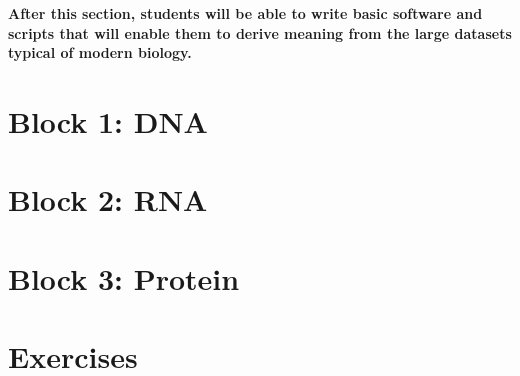 \documentclass[]{book}
\begin{document}
\textbf{After this section, students will be able to write basic
software and scripts that will enable them to derive meaning from the
large datasets typical of modern biology.}

\chapter{Block 1: DNA}\label{block-dna}

\chapter{Block 2: RNA}\label{block-rna}

\chapter{Block 3: Protein}\label{block-protein}

\chapter{Exercises}\label{exercises}


\end{document}
